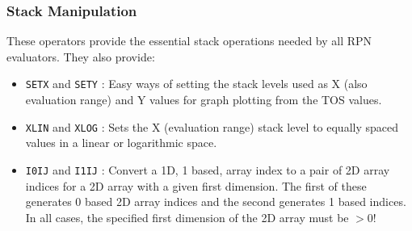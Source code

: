 \documentclass[a4paper,twoside,11pt]{article}
\newcommand{\newpara}{\par\vspace{4mm}\noindent}
\begin{document}
\subsubsection{Stack Manipulation}
These operators provide the essential stack operations needed by all RPN evaluators. They also provide:
\begin{itemize}
\item \texttt{SETX} and \texttt{SETY} : Easy ways of setting the stack levels used as X (also evaluation range) and Y values 
	for graph plotting from the TOS values.
\item \texttt{XLIN} and \texttt{XLOG} : Sets the X (evaluation range) stack level to equally spaced values 
	in a linear or logarithmic space.
\item \texttt{I0IJ} and \texttt{I1IJ} : Convert a 1D, 1 based, array index to a pair of 2D array indices for a 2D array 
	with a given first dimension. The first of these generates 0 based 2D array indices and the second generates 1 based
	indices. In all cases, the specified first dimension of the 2D array must be $>0$!
\end{itemize}
\newpara
{}
\end{document}
